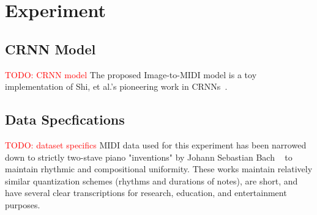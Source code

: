 \documentclass[review,sigconf]{acmart}
\newcommand{\todo}[1]{\textcolor{red}{TODO: #1}}
\begin{document}
\section{Experiment}

\subsection{CRNN Model}
\todo{CRNN model}
The proposed Image-to-MIDI model is a toy implementation of Shi, et al.'s pioneering work in CRNNs~\cite{shi2015endtoend}.

\subsection{Data Specfications}
\todo{dataset specifics}
MIDI data used for this experiment has been narrowed down to strictly two-stave piano "inventions" by Johann Sebastian Bach ~\cite{bach_midi} to maintain rhythmic and compositional uniformity.
These works maintain relatively similar quantization schemes (rhythms and durations of notes), are short, and have several clear transcriptions for research, education, and entertainment purposes.
\end{document}
